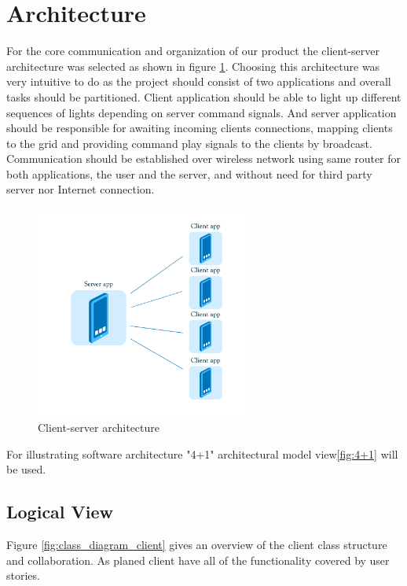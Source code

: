\section{Architecture}
For the core communication and organization of our product the client-server architecture was selected as shown in figure \ref{fig:sprint1_arhitecture}.
Choosing this architecture was very intuitive to do as the project should consist of two applications and overall tasks should be partitioned. 
Client application should be able to light up different sequences of lights depending on server command signals.
And server application should be responsible for awaiting incoming clients connections, mapping clients to the grid and providing command play signals to the clients by broadcast.
Communication should be established over wireless network using same router for both applications, the user and the server, and without need for third party server nor Internet connection.

\begin{figure}[H]
	\centering
		\includegraphics[width=7cm]{sprint1/arhitecture.png}
	\caption{Client-server architecture}
	\label{fig:sprint1_arhitecture}
\end{figure}

For illustrating software architecture "4+1" architectural model view\ref{fig:4+1} will be used.

\subsection{Logical View}
Figure \ref{fig:class_diagram_client} gives an overview of the client class structure and collaboration. As planed client have all of the functionality covered by user stories. 

